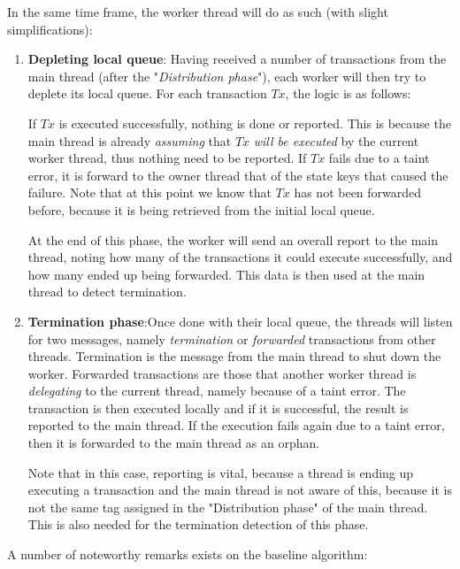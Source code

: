 In the same time frame, the worker thread will do as such (with slight simplifications):

\begin{enumerate}
	\item \textbf{Depleting local queue}: Having received a number of transactions from the main
	thread (after the "\textit{Distribution phase}"), each worker will then try to deplete its local
	queue. For each transaction $Tx$, the logic is as follows:

	If $Tx$ is executed successfully, nothing is done or reported. This is because the main thread
	is already \textit{assuming} that $Tx$ \textit{will be executed} by the current worker thread,
	thus nothing need to be reported. If $Tx$ fails due to a taint error, it is forward to the owner
	thread that of the state keys that caused the failure. Note that at this point we know that $Tx$
	has not been forwarded before, because it is being retrieved from the initial local queue.

	At the end of this phase, the worker will send an overall report to the main thread, noting how
	many of the transactions it could execute successfully, and how many ended up being forwarded.
	This data is then used at the main thread to detect termination.

	\item \textbf{Termination phase}:Once done with their local queue, the threads will listen for
	two messages, namely \textit{termination} or \textit{forwarded} transactions from other threads.
	Termination is the message from the main thread to shut down the worker. Forwarded transactions
	are those that another worker thread is \textit{delegating} to the current thread, namely
	because of a taint error. The transaction is then executed locally and if it is successful, the
	result is reported to the main thread. If the execution fails again due to a taint error, then
	it is forwarded to the main thread as an orphan.

	Note that in this case, reporting is vital, because a thread is ending up executing a
	transaction and the main thread is not aware of this, because it is not the same tag assigned in
	the "Distribution phase" of the main thread. This is also needed for the termination detection
	of this phase.
\end{enumerate}


A number of noteworthy remarks exists on the baseline algorithm:

